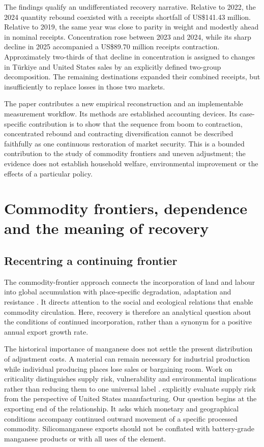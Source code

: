 \documentclass[11pt,a4paper]{article}
\begin{document}
The findings qualify an undifferentiated recovery narrative. Relative to 2022, the 2024 quantity rebound coexisted with a receipts shortfall of US\$141.43 million. Relative to 2019, the same year was close to parity in weight and modestly ahead in nominal receipts. Concentration rose between 2023 and 2024, while its sharp decline in 2025 accompanied a US\$89.70 million receipts contraction. Approximately two-thirds of that decline in concentration is assigned to changes in T\"urkiye and United States sales by an explicitly defined two-group decomposition. The remaining destinations expanded their combined receipts, but insufficiently to replace losses in those two markets.

The paper contributes a new empirical reconstruction and an implementable measurement workflow. Its methods are established accounting devices. Its case-specific contribution is to show that the sequence from boom to contraction, concentrated rebound and contracting diversification cannot be described faithfully as one continuous restoration of market security. This is a bounded contribution to the study of commodity frontiers and uneven adjustment; the evidence does not establish household welfare, environmental improvement or the effects of a particular policy.

\section{Commodity frontiers, dependence and the meaning of recovery}
\subsection{Recentring a continuing frontier}
The commodity-frontier approach connects the incorporation of land and labour into global accumulation with place-specific degradation, adaptation and resistance \citep{beckert2021}. It directs attention to the social and ecological relations that enable commodity circulation. Here, recovery is therefore an analytical question about the conditions of continued incorporation, rather than a synonym for a positive annual export growth rate.

The historical importance of manganese does not settle the present distribution of adjustment costs. A material can remain necessary for industrial production while individual producing places lose sales or bargaining room. Work on criticality distinguishes supply risk, vulnerability and environmental implications rather than reducing them to one universal label \citep{graedel2015}. \citet{nassar2020} explicitly evaluate supply risk from the perspective of United States manufacturing. Our question begins at the exporting end of the relationship. It asks which monetary and geographical conditions accompany continued outward movement of a specific processed commodity. Silicomanganese exports should not be conflated with battery-grade manganese products or with all uses of the element.
\end{document}
